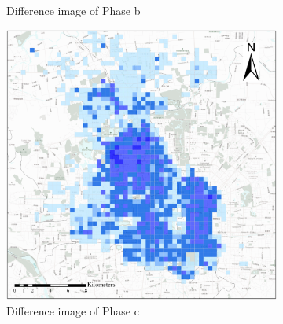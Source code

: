 \documentclass[preprints,ijgi,submit,moreauthors]{Definitions/mdpi}
\begin{document}
\begin{figure}[ht]
\begin{subfigure}{.28\textwidth}
        \caption{Difference image of Phase b}\label{fig:p_b_dif}
    \end{subfigure}
        \begin{subfigure}{.28\textwidth}
        \includegraphics[width=\textwidth]{Figures/BSSMinusmp3.eps}
        \caption{Difference image of Phase c}\label{fig:p_c_dif}
    \end{subfigure}
    \begin{subfigure}{.14\textwidth}

\end{subfigure}
\end{figure}
\end{document}
